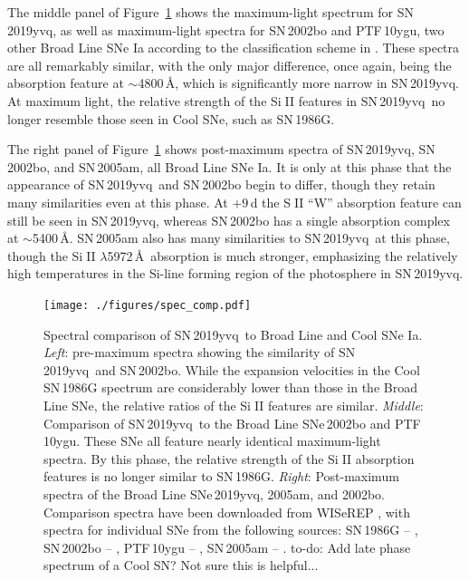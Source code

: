 \documentclass[twocolumn]{aastex63}
\def\ion#1#2{#1$\;${\footnotesize\rm{#2}}\relax}
\newcommand{\todo}[1]{{\color{magenta} to-do: {#1}}}
\newcommand{\sn}{SN\,2019yvq}
\begin{document}
The middle panel of Figure~\ref{fig:spec_comp} shows the maximum-light
spectrum for \sn, as well as maximum-light spectra for SN\,2002bo and
PTF\,10ygu, two other Broad Line SNe Ia according to the classification
scheme in \citet{Branch06}. These spectra are all remarkably similar, with
the only major difference, once again, being the absorption feature at
$\sim$4800\,\AA, which is significantly more narrow in \sn. At maximum light,
the relative strength of the \ion{Si}{II} features in \sn\ no longer resemble
those seen in \citet{Branch06} Cool SNe, such as SN\,1986G.

The right panel of Figure~\ref{fig:spec_comp} shows post-maximum spectra of
\sn, SN\,2002bo, and SN\,2005am, all Broad Line SNe Ia. It is only at this
phase that the appearance of \sn\ and SN\,2002bo begin to differ, though they
retain many similarities even at this phase. At $+9$\,d the \ion{S}{II} ``W''
absorption feature can still be seen in \sn, whereas SN\,2002bo has a single
absorption complex at $\sim$5400\,\AA. SN\,2005am also has many similarities
to \sn\ at this phase, though the \ion{Si}{II} $\lambda$5972\,\AA\ absorption
is much stronger, emphasizing the relatively high temperatures in the Si-line
forming region of the photosphere in \sn.

\begin{figure}
    \centering
    \texttt{[image: ./figures/spec\_comp.pdf]}
    \caption{Spectral comparison of \sn\ to \citet{Branch06} Broad Line and
    Cool SNe Ia. \textit{Left}: pre-maximum spectra showing the similarity of
    \sn\ and SN\,2002bo. While the expansion velocities in the Cool SN\,1986G
    spectrum are considerably lower than those in the Broad Line SNe, the
    relative ratios of the \ion{Si}{II} features are similar.
    \textit{Middle}: Comparison of \sn\ to the Broad Line SNe\,2002bo and
    PTF\,10ygu. These SNe all feature nearly identical maximum-light spectra.
    By this phase, the relative strength of the \ion{Si}{II} absorption
    features is no longer similar to SN\,1986G. \textit{Right}: Post-maximum
    spectra of the Broad Line SNe\,2019yvq, 2005am, and 2002bo. Comparison
    spectra have been downloaded from WISeREP \citep{Yaron12}, with spectra
    for individual SNe from the following sources: SN\,1986G --
    \citet{Cristiani92}, SN\,2002bo -- \citet{Benetti04,Silverman11},
    PTF\,10ygu -- \citet{Maguire14}, SN\,2005am -- \citet{Silverman12}.
    \todo{Add late phase spectrum of a Cool SN? Not sure this is helpful...}}
    \label{fig:spec_comp}
\end{figure}
\end{document}
